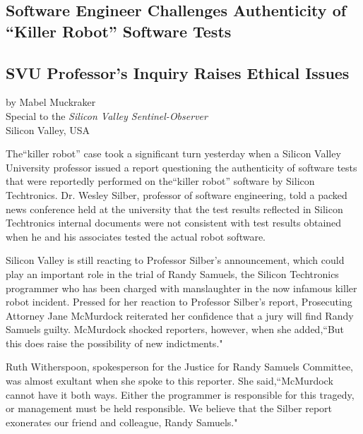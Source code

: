 \begin{center}
\section*{Software Engineer Challenges Authenticity of ``Killer Robot'' Software Tests}
\subsection*{SVU Professor's Inquiry Raises Ethical Issues}
by Mabel Muckraker\\
Special to the \textit{Silicon Valley Sentinel-Observer}\\
Silicon Valley, USA
\end{center}

The``killer robot'' case took a significant turn yesterday when a Silicon Valley University professor issued a report questioning the authenticity of software tests that were reportedly performed on the``killer robot'' software by Silicon Techtronics. Dr. Wesley Silber, professor of software engineering, told a packed news conference held at the university that the test results reflected in Silicon Techtronics internal documents were not consistent with test results obtained when he and his associates tested the actual robot software.

Silicon Valley is still reacting to Professor Silber's announcement, which could play an important role in the trial of Randy Samuels, the Silicon Techtronics programmer who has been charged with manslaughter in the now infamous killer robot incident. Pressed for her reaction to Professor Silber's report, Prosecuting Attorney Jane McMurdock reiterated her confidence that a jury will find Randy Samuels guilty. McMurdock shocked reporters, however, when she added,``But this does raise the possibility of new indictments."

Ruth Witherspoon, spokesperson for the Justice for Randy Samuels Committee, was almost exultant when she spoke to this reporter. She said,``McMurdock cannot have it both ways. Either the programmer is responsible for this tragedy, or management must be held responsible. We believe that the Silber report exonerates our friend and colleague, Randy Samuels."

